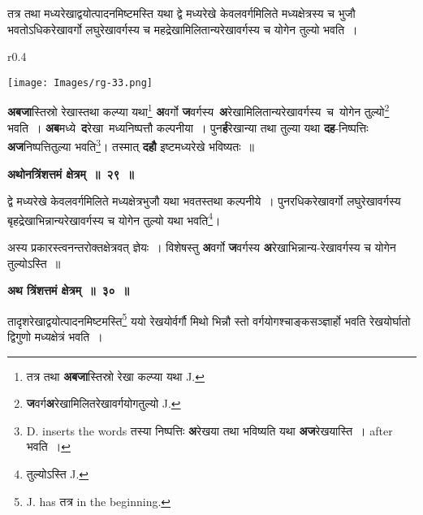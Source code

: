\documentclass[11pt, openany]{book}
\begin{document}
{\ab तत्र तथा मध्यरेखाद्वयोत्पादनमिष्टमस्ति यथा द्वे मध्यरेखे केवलवर्गमिलिते मध्यक्षेत्रस्य च भुजौ भवतोऽधिकरेखावर्गो लघुरेखावर्गस्य च महद्रेखामिलितान्यरेखावर्गस्य च योगेन तुल्यो भवति~। }\\

\begin{wrapfigure}{r}{0.4\textwidth}
\vspace{-8mm}
\begin{center}
\texttt{[image: Images/rg-33.png]}
\end{center}
\vspace{-8mm}
\end{wrapfigure}

 \textbf{अबजा}स्तिस्रो रेखास्तथा कल्प्या यथा\renewcommand{\thefootnote}{१}\footnote{तत्र तथा \textbf{अबजा}स्तिस्रो रेखा कल्प्या यथा {\en J.}} \textbf{अ}वर्गो \textbf{ज}वर्गस्य \,\textbf{अ}रेखामिलितान्यरेखावर्गस्य \,च \,योगेन तुल्यो\renewcommand{\thefootnote}{२}\footnote{\textbf{ज}वर्ग\textbf{अ}रेखामिलितरेखावर्गयोगतुल्यो {\en J.}} \,भवति~। \textbf{अब}मध्ये \,\textbf{द}रेखा \,मध्यनिष्पत्तौ कल्पनीया~। पुन\textbf{र्ह}रेखान्या तथा तुल्या यथा \textbf{दह}-निष्पत्तिः \textbf{अज}निष्पत्तितुल्या भवति\renewcommand{\thefootnote}{३}\footnote{{\en D. inserts the words} तस्या निष्पत्तिः \textbf{अ}रेखया तथा भविष्यति यथा \textbf{अज}रेखयास्ति~। {\en after} भवति~।}\;। तस्मात् \textbf{दहौ} इष्टमध्यरेखे भविष्यतः~॥ 
\vspace{2mm}

\begin{center}
\textbf{\large अथोनत्रिंशत्तमं क्षेत्रम्~॥~२९~॥}
\end{center}

 {\ab द्वे मध्यरेखे केवलवर्गमिलिते मध्यक्षेत्रभुजौ यथा भवतस्तथा कल्पनीये~। पुनरधिकरेखावर्गो लघुरेखावर्गस्य बृहद्रेखाभिन्नान्यरेखावर्गस्य च योगेन तुल्यो यथा भवति\renewcommand{\thefootnote}{४}\footnote{तुल्योऽस्ति {\en J.}}\;। }
 
\newpage
अस्य प्रकारस्त्वनन्तरोक्तक्षेत्रवत् ज्ञेयः~। विशेषस्तु \textbf{अ}वर्गो \textbf{ज}वर्गस्य \textbf{अ}रेखाभिन्नान्य-रेखावर्गस्य च योगेन तुल्योऽस्ति~॥ 
\vspace{2mm}

\begin{center}
\textbf{\large अथ त्रिंशत्तमं क्षेत्रम्~॥~३०~॥}
\end{center}

{\ab तादृशरेखाद्वयोत्पादनमिष्टमस्ति\renewcommand{\thefootnote}{१}\footnote{{\en J. has} तत्र {\en in the beginning.}} ययो रेखयोर्वर्गौ मिथो भिन्नौ स्तो वर्गयोगश्चाङ्कसञ्ज्ञार्हो भवति रेखयोर्घातो द्विगुणो मध्यक्षेत्रं भवति~। }\\
\end{document}
